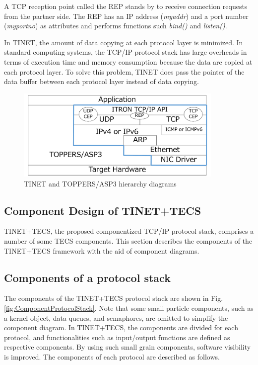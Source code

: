 \documentclass[a4j,12pt,oneside,openany,english]{jsbook}
\begin{document}
A TCP reception point called the REP stands by to receive connection requests from the partner side.
The REP has an IP address ({\it myaddr}) and a port number ({\it myportno}) as attributes and performs functions such {\it bind()} and {\it listen()}.

In TINET, the amount of data copying at each protocol layer is minimized.
In standard computing systems, the TCP/IP protocol stack has large overheads in terms of execution time and memory consumption because the data are copied at each protocol layer.
To solve this problem, TINET does pass the pointer of the data buffer between each protocol layer instead of data copying.

\begin{figure}[t]
    \centering
    \includegraphics[width=10cm,clip]{figure/TINETHierarchyDiagram.pdf}
    \caption{TINET and TOPPERS/ASP3 hierarchy diagrams}
    \label{fig:TINETHierarchyDiagram}
\end{figure}

\subsection{Component Design of TINET+TECS}

TINET+TECS, the proposed componentized TCP/IP protocol stack, comprises a number of some TECS components.
This section describes the components of the TINET+TECS framework with the aid of component diagrams.

\subsection*{Components of a protocol stack}

The components of the TINET+TECS protocol stack are shown in Fig.\ref{fig:ComponentProtocolStack}.
Note that some small particle components, such as a kernel object, data queues, and semaphores, are omitted to simplify the component diagram.
In TINET+TECS, the components are divided for each protocol, and functionalities such as input/output functions are defined as respective components.
By using such small grain components, software visibility is improved.
The components of each protocol are described as follows.
\end{document}
